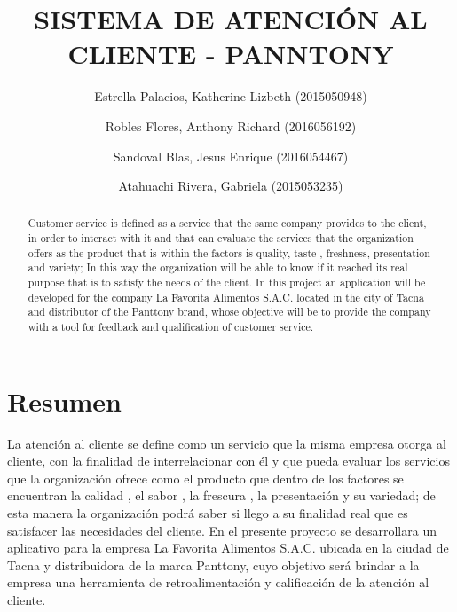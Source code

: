 \documentclass[preprint,12pt]{elsarticle}
\begin{document}
	
	\begin{frontmatter}

		\title{\huge  SISTEMA DE ATENCIÓN AL CLIENTE - PANNTONY}
		
		\author{Estrella Palacios, Katherine Lizbeth      (2015050948)}		
		\author{Robles Flores, Anthony Richard	(2016056192)}
		\author{Sandoval Blas, Jesus Enrique           	(2016054467)}
		\author{Atahuachi Rivera, Gabriela            	(2015053235)}
		
		\address{Tacna, Perú}
		
		\begin{abstract}
Customer service is defined as a service that the same company provides to the client, in order to interact with it and that can evaluate the services that the organization offers as the product that is within the factors is quality, taste , freshness, presentation and variety; In this way the organization will be able to know if it reached its real purpose that is to satisfy the needs of the client. In this project an application will be developed for the company La Favorita Alimentos S.A.C. located in the city of Tacna and distributor of the Panttony brand, whose objective will be to provide the company with a tool for feedback and qualification of customer service.
		\end{abstract}
\end{frontmatter}

\section{Resumen}
La atención al cliente se define como un servicio que la misma empresa otorga al cliente, con la finalidad de interrelacionar con él y que pueda evaluar los servicios que la organización ofrece como el producto que dentro de los factores se encuentran la calidad , el sabor , la frescura , la presentación y su variedad; de esta  manera la organización podrá saber si llego a su finalidad real que es satisfacer las necesidades del cliente. En el presente proyecto se desarrollara un aplicativo para la empresa La Favorita Alimentos S.A.C. ubicada en la ciudad de Tacna y distribuidora de la marca Panttony, cuyo objetivo será brindar a la empresa una herramienta de retroalimentación y calificación de la atención al cliente.
\end{document}
